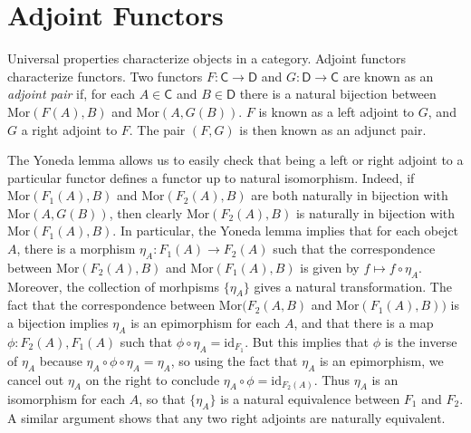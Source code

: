 \section{Adjoint Functors}

Universal properties characterize objects in a category. Adjoint functors characterize functors. Two functors $F: \mathsf{C} \to \mathsf{D}$ and $G: \mathsf{D} \to \mathsf{C}$ are known as an \emph{adjoint pair} if, for each $A \in \mathsf{C}$ and $B \in \mathsf{D}$ there is a natural bijection between $\text{Mor}(F(A), B)$ and $\text{Mor}(A,G(B))$. $F$ is known as a left adjoint to $G$, and $G$ a right adjoint to $F$. The pair $(F,G)$ is then known as an adjunct pair.

The Yoneda lemma allows us to easily check that being a left or right adjoint to a particular functor defines a functor up to natural isomorphism. Indeed, if $\text{Mor}(F_1(A),B)$ and $\text{Mor}(F_2(A),B)$ are both naturally in bijection with $\text{Mor}(A,G(B))$, then clearly $\text{Mor}(F_2(A),B)$ is naturally in bijection with $\text{Mor}(F_1(A),B)$. In particular, the Yoneda lemma implies that for each obejct $A$, there is a morphism $\eta_A: F_1(A) \to F_2(A)$ such that the correspondence between $\text{Mor}(F_2(A),B)$ and $\text{Mor}(F_1(A),B)$ is given by $f \mapsto f \circ \eta_A$. Moreover, the collection of morhpisms $\{ \eta_A \}$ gives a natural transformation. The fact that the correspondence between $\text{Mor}(F_2(A,B)$ and $\text{Mor}(F_1(A),B))$ is a bijection implies $\eta_A$ is an epimorphism for each $A$, and that there is a map $\phi: F_2(A),F_1(A)$ such that $\phi \circ \eta_A = \text{id}_{F_1}$. But this implies that $\phi$ is the inverse of $\eta_A$ because $\eta_A \circ \phi \circ \eta_A = \eta_A$, so using the fact that $\eta_A$ is an epimorphism, we cancel out $\eta_A$ on the right to conclude $\eta_A \circ \phi = \text{id}_{F_2(A)}$. Thus $\eta_A$ is an isomorphism for each $A$, so that $\{ \eta_A \}$ is a natural equivalence between $F_1$ and $F_2$. A similar argument shows that any two right adjoints are naturally equivalent.

